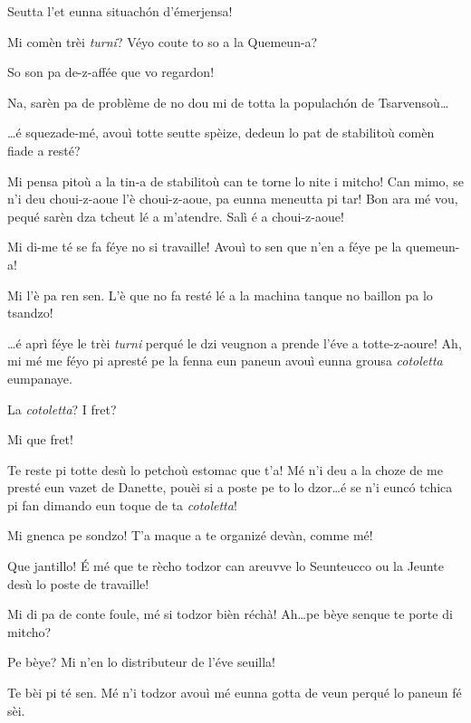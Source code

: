 \begin{drama}
\Seunteuccospeaks{} Seutta l’et eunna situach\'on d’émerjensa!

\Diegospeaks Mi comèn trèi \textit{turni}? Véyo coute to so a la Quemeun-a?

\Seunteuccospeaks So son pa de-z-affée que vo regardon!

\Diegospeaks Na, sarèn pa de problème de no dou mi de totta la populach\'on de Tsarvensoù\ldots

\Attilaspeaks \ldots é squezade-mé, avouì totte seutte spèize, dedeun lo pat de stabilitoù comèn fiade a resté?

\Seunteuccospeaks Mi pensa pitoù a la tin-a de stabilitoù can te torne lo nite i mitcho! Can mimo, se n'i deu choui-z-aoue l'è choui-z-aoue, pa eunna meneutta pi tar! Bon ara mé vou, pequé sarèn dza tcheut lé a m’atendre. Salì é a choui-z-aoue! 


\Attilaspeaks Mi di-me té se fa féye no si travaille! Avouì to sen que n'en a féye pe la quemeun-a!

\Diegospeaks Mi l'è pa ren sen. L'è que no fa resté lé a la machina tanque no baillon pa lo tsandzo!

\Attilaspeaks \ldots é aprì féye le trèi \textit{turni} perqué le dzi veugnon a prende l'éve a totte-z-aoure! Ah, mi mé me féyo pi apresté pe la fenna eun paneun avouì eunna grousa \textit{cotoletta} eumpanaye.

\Diegospeaks La \textit{cotoletta}? I fret? \frette

\Attilaspeaks Mi que fret!

\Diegospeaks Te reste pi totte desù lo  petchoù estomac  que t'a! Mé n'i deu a la choze de me presté eun vazet de Danette, pouèi si a poste pe to lo dzor\ldots é se n'i eunc\'o tchica pi fan dimando eun toque de ta \textit{cotoletta}!

\Attilaspeaks Mi  gnenca pe sondzo! T'a maque a te organizé devàn, comme mé!

\Diegospeaks Que jantillo! \'E mé que te rècho todzor can areuvve lo Seunteucco ou la Jeunte desù lo poste de travaille! 

\Attilaspeaks Mi di pa de conte foule, mé si todzor bièn réchà! Ah\ldots pe bèye senque te porte di mitcho?

\Diegospeaks Pe bèye? Mi n'en lo distributeur de l'éve seuilla!

\Attilaspeaks Te bèi pi té sen. Mé n'i todzor avouì mé eunna gotta de veun  perqué lo paneun fé sèi.


\end{drama}
